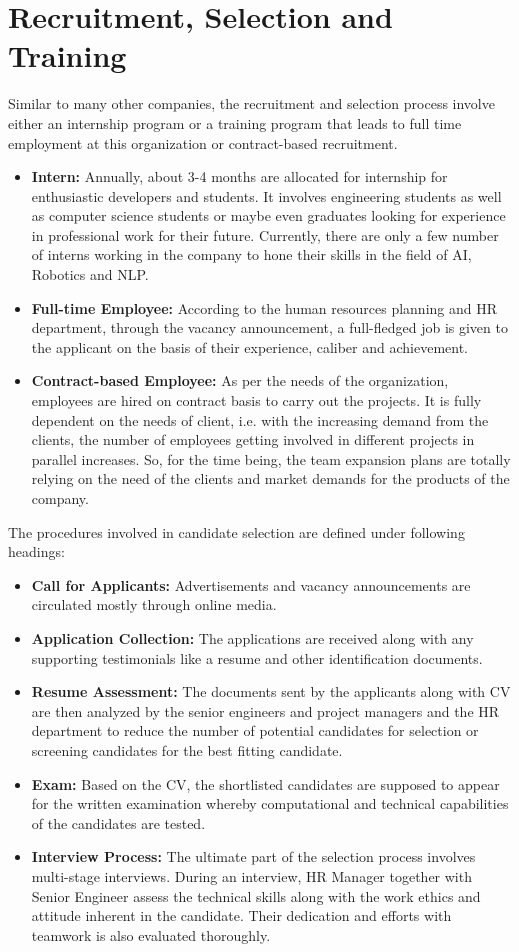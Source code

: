 \documentclass[12pt,a4paper]{scrreprt}
\begin{document}
\section{Recruitment, Selection and Training}
Similar to many other companies, the recruitment and selection process involve either an internship program or a training program that leads to full time employment at this organization or contract-based recruitment.
	\begin{itemize}
		\item \textbf{Intern:} Annually, about 3-4 months are allocated for internship for enthusiastic developers and students. It involves engineering students as well as computer science students or maybe even graduates looking for experience in professional work for their future. Currently, there are only a few number of interns working in the company to hone their skills in the field of AI, Robotics and NLP.
		\item \textbf{Full-time Employee:} According to the human resources planning and HR department, through the vacancy announcement, a full-fledged job is given to the applicant on the basis of their experience, caliber and achievement.
		\item \textbf{Contract-based Employee:} As per the needs of the organization, employees are hired on contract basis to carry out the projects. It is fully dependent on the needs of client, i.e. with the increasing demand from the clients, the number of employees getting involved in different projects in parallel increases. So, for the time being, the team expansion plans are totally relying on the need of the clients and market demands for the products of the company.
	\end{itemize}
	
The procedures involved in candidate selection are defined under following headings:
	\begin{itemize}
		\item \textbf{Call for Applicants:} Advertisements and vacancy announcements are circulated mostly through online media.
		\item \textbf{Application Collection:} The applications are received along with any supporting testimonials like a resume and other identification documents.
		\item \textbf{Resume Assessment:} The documents sent by the applicants along with CV are then analyzed by the senior engineers and project managers and the HR department to reduce the number of potential candidates for selection or screening candidates for the best fitting candidate.
		\item \textbf{Exam:} Based on the CV, the shortlisted candidates are supposed to appear for the written examination whereby computational and technical capabilities of the
candidates are tested.
		\item \textbf{Interview Process:} The ultimate part of the selection process involves multi-stage interviews. During an interview, HR Manager together with Senior Engineer assess
the technical skills along with the work ethics and attitude inherent in the candidate. Their dedication and efforts with teamwork is also evaluated thoroughly.
	\end{itemize}
\end{document}
